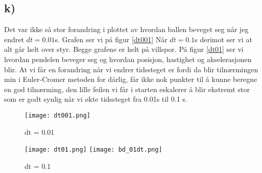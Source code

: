 \documentclass[a4paper,12pt,norsk]{article}
\begin{document}
\subsection*{k)}
Det var ikke så stor forandring  i plottet av hvordan ballen beveget seg når jeg endret $dt = 0.01$s. Grafen ser vi på figur \vref{dt001} Når $dt = 0.1$s derimot ser vi at alt går helt over styr. Begge grafene er helt på villspor. På figur \vref{dt01} ser vi hvordan pendelen beveger seg og hvordan posisjon, hastighet og akselerasjonen blir. At vi får en forandring når vi endrer tidssteget er fordi da blir tilnærmingen min i Euler-Cromer metoden for dårlig, får ikke nok punkter til å kunne beregne en god tilnærming, den lille feilen vi får i starten eskalerer å blir ekstremt stor som er godt synlig når vi økte tidssteget fra 0.01s til 0.1 s. 
\begin{figure}[h!]
\texttt{[image: dt001.png]} 
\caption{dt = 0.01}
\label{dt001}
\end{figure}
\begin{figure}[h!]
\texttt{[image: dt01.png]} 
\texttt{[image: bd\_01dt.png]} 
\caption{dt = 0.1}
\label{dt01}
\end{figure}
\end{document}
